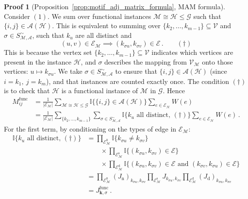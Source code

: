 \documentclass[12pt]{ociamthesis}
\theoremstyle{plain}
\theoremstyle{definition}
\newtheorem{prf}{Proof}[chapter]
\theoremstyle{remark}
\newcommand\bb[1]{\mathbb{#1}}
\newcommand\ca[1]{\mathcal{#1}}
\begin{document}
\begin{prf}[Proposition~\ref{prop:motif_adj_matrix_formula}, MAM formula]
  \label{proof:motif_adj_matrix_formula}
  Consider $(1)$. We sum over functional instances $\ca{M} \cong \ca{H} \leq
  \ca{G}$ such that $\{i,j\} \in \ca{A(H)}$.
  This is equivalent to summing over $\{k_2, \ldots, k_{m-1}\} \subseteq
  \ca{V}$ and $\sigma \in S_\ca{M,A}^\sim$, such that $k_u$ are all distinct
  and
  $$ (u,v) \in \ca{E_M} \implies (k_{\sigma u}, k_{\sigma v}) \in \ca{E}\,.
  \qquad (\dagger) $$
  This is because the vertex set $\{k_2, \ldots, k_{m-1}\} \subseteq \ca{V}$
  indicates which vertices are present in the instance $\ca{H}$, and $\sigma$
  describes the mapping from $\ca{V_M}$ onto those vertices: $u \mapsto
  k_{\sigma u}$. We take $\sigma \in S_\ca{M,A}^\sim$ to ensure that $\{i,j\}
  \in \ca{A(H)}$ (since $i=k_1, \ j=k_m$), and that instances are counted
  exactly once.
  The condition $(\dagger)$ is to check that $\ca{H}$ is a functional instance
  of $\ca{M}$ in $\ca{G}$. Hence
  \begin{align*}
    M^\mathrm{func}_{i j} &= \frac{1}{|\ca{E_M}|}
    \sum_{\ca{M} \cong \ca{H} \leq
    \ca{G}} \bb{I} \big\{ \{i,j\} \in \ca{A}(\ca{H}) \big\} \sum_{e \in
    \ca{E_H}} W(e) \\
    &=  \frac{1}{|\ca{E_M}|} \sum_{\{ k_2, \ldots, k_{m-1} \}} \sum_{\sigma \in
    S_\ca{M,A}^\sim} \bb{I} \big\{ k_u \textrm{ all distinct}, \, (\dagger)
    \big\} \sum_{e \in \ca{E_H}} W(e)\,.
  \end{align*}
  For the first term, by conditioning on the types of edge in $\ca{E_M}$:
  \begin{align*}
    \bb{I} \big\{ k_u \textrm{ all distinct}, \, (\dagger) \big\}
    &= \prod_{\ca{E}_\ca{M}^0} \bb{I} \{ k_{\sigma u} \neq k_{\sigma v} \} \\
    & \qquad \times \prod_{\ca{E}_\ca{M}^\mathrm{s}} \bb{I} \{ (k_{\sigma u},
    k_{\sigma v}) \in \ca{E} \} \\
    & \qquad \times \prod_{\ca{E}_\ca{M}^\mathrm{d}} \bb{I} \{(k_{\sigma u},
      k_{\sigma v}) \in \ca{E} \textrm{ and } (k_{\sigma v}, k_{\sigma u}) \in
    \ca{E}\} \\
    &= \prod_{\ca{E}_\ca{M}^0} (J_\mathrm{n})_{k_{\sigma u},k_{\sigma v}}
    \prod_{\ca{E}_\ca{M}^\mathrm{s}} J_{k_{\sigma u},k_{\sigma v}}
    \prod_{\ca{E}_\ca{M}^\mathrm{d}} (J_\mathrm{d})_{k_{\sigma u},k_{\sigma v}}
    \\
    &= J^\mathrm{func}_{\mathbf{k},\sigma}\,.

\end{align*}
\end{prf}
\end{document}
